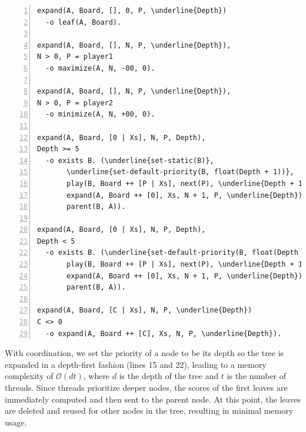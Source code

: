 \begin{topfig}
\scriptsize\begin{Verbatim}[numbers=left,commandchars=\\\{\}]
expand(A, Board, [], 0, P, \underline{Depth})
  -o leaf(A, Board).

expand(A, Board, [], N, P, \underline{Depth}),
N > 0, P = player1
  -o maximize(A, N, -00, 0).

expand(A, Board, [], N, P, \underline{Depth}),
N > 0, P = player2
  -o minimize(A, N, +00, 0).

expand(A, Board, [0 | Xs], N, P, Depth),
Depth >= 5
  -o exists B. (\underline{set-static(B)},
       \underline{set-default-priority(B, float(Depth + 1))},
       play(B, Board ++ [P | Xs], next(P), \underline{Depth + 1}),
       expand(A, Board ++ [0], Xs, N + 1, P, \underline{Depth}),
       parent(B, A)).

expand(A, Board, [0 | Xs], N, P, Depth),
Depth < 5
  -o exists B. (\underline{set-default-priority(B, float(Depth + 1))},
       play(B, Board ++ [P | Xs], next(P), \underline{Depth + 1}),
       expand(A, Board ++ [0], Xs, N + 1, P, \underline{Depth}),
       parent(B, A)).

expand(A, Board, [C | Xs], N, P, \underline{Depth})
C <> 0
  -o expand(A, Board ++ [C], Xs, N, P, \underline{Depth}).
\end{Verbatim}
\end{topfig}
\normalsize

With coordination, we set the priority of a node to be its depth
so the tree is expanded in a depth-first fashion (lines 15 and 22),
leading to a memory complexity of $\mathcal{O}(d t)$, where $d$
is the depth of the tree and $t$ is the number of threads.
Since threads prioritize deeper nodes, the scores of the first leaves are immediately
computed and then sent to the parent node. At this point, the leaves are deleted
and reused for other nodes in the tree, resulting in minimal memory usage.

